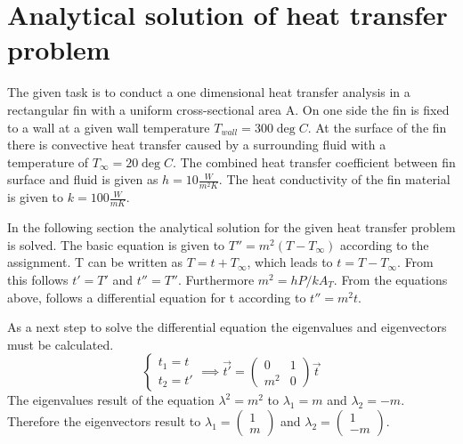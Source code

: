 
\chapter{Analytical solution of heat transfer problem}
\label{ch:anaSol}

The given task is to conduct a one dimensional heat transfer analysis in a rectangular fin with a uniform cross-sectional area A. On one side the fin is fixed to a wall at a given wall temperature $T_{wall} = 300 \deg C$. At the surface of the fin there is convective heat transfer caused by a surrounding fluid with a temperature of $T_{\infty} = 20 \deg C$. The combined heat transfer coefficient between fin surface and fluid is given as $h = 10 \frac{W}{m^{2}K}$. The heat conductivity of the fin material is given to $k = 100 \frac{W}{mK}$.

In the following section the analytical solution for the given heat transfer problem is solved. 
The basic equation is given to $T'' = m^2 (T-T_{\infty})$ according to the assignment.
T can be written as $T = t + T_{\infty}$, which leads to $t = T - T_{\infty}$. 
From this follows $t' = T'$ and $t'' = T''$.
Furthermore $m^{2} = hP/kA_{T}$.
From the equations above, follows a differential equation for t according to $t'' = m^{2}t$.

As a next step to solve the differential equation the eigenvalues and eigenvectors must be calculated. 
\begin{equation}
\begin{cases}
t_{1} = t \\
t_{2} = t'
\end{cases}
						\implies \vec{t'} = 	\begin{pmatrix}	0 & 1\\	m^{2} & 0 \end{pmatrix}  \vec{t}
\end{equation}
The eigenvalues result of the equation $\lambda^{2} = m^{2}$ to $\lambda_{1} = m$ and $\lambda_{2} = -m$.
Therefore the eigenvectors result to $\lambda_{1} = \begin{pmatrix}	1\\	m \end{pmatrix}$ and $\lambda_{2} = \begin{pmatrix}	1 \\	-m \end{pmatrix}$.

